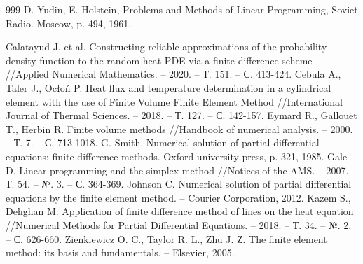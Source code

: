 \documentclass[a4paper,11pt,numreferences,mathsec,kaplist]{isuepsutf8}
\begin{document}
\begin{article}
\begin{bibliographyl}{999}
D. Yudin, E. Holstein, Problems and Methods of Linear
    Programming, Soviet Radio. Moscow, p. 494, 1961.


 Calatayud J. et al. Constructing reliable
    approximations of the probability density function to the random
    heat PDE via a finite difference scheme //Applied Numerical
    Mathematics. – 2020. – Т. 151. – С. 413-424.
Cebula A., Taler J., Ocłoń P. Heat flux and
    temperature determination in a cylindrical element with the use of
    Finite Volume Finite Element Method //International Journal of
    Thermal Sciences. – 2018. – Т. 127. – С. 142-157.
Eymard R., Gallouët T., Herbin R. Finite volume
    methods //Handbook of numerical analysis. – 2000. – Т. 7. – С.
    713-1018.
 G. Smith, Numerical solution of partial differential
    equations: finite difference methods. Oxford university press, p.
    321, 1985.
 Gale D. Linear programming and the simplex method
    //Notices of the AMS. – 2007. – Т. 54. – №. 3. – С. 364-369.
 Johnson C. Numerical solution of partial differential
    equations by the finite element method. – Courier Corporation,
    2012.
Kazem S., Dehghan M. Application of finite difference
    method of lines on the heat equation //Numerical Methods for
    Partial Differential Equations. – 2018. – Т. 34. – №. 2. – С.
    626-660.
Zienkiewicz O. C., Taylor R. L., Zhu J. Z. The finite
    element method: its basis and fundamentals. – Elsevier, 2005.
\end{bibliographyl}





\end{article}
\end{document}
